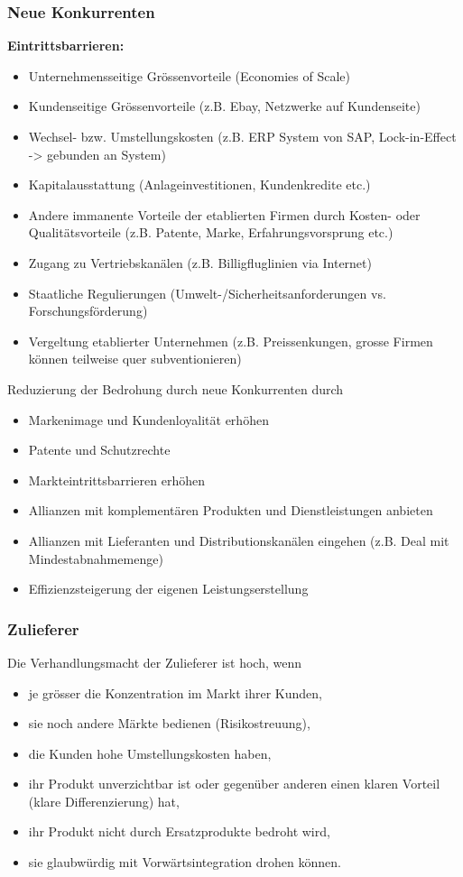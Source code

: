 \subsubsection{Neue Konkurrenten}
\textbf{Eintrittsbarrieren:}
\begin{itemize}
	\item Unternehmensseitige Grössenvorteile (Economies of Scale)
	\item Kundenseitige Grössenvorteile (z.B. Ebay, Netzwerke auf Kundenseite)
	\item Wechsel- bzw. Umstellungskosten (z.B. ERP System von SAP, Lock-in-Effect -> gebunden an System)
	\item Kapitalausstattung (Anlageinvestitionen, Kundenkredite etc.)
	\item Andere immanente Vorteile der etablierten Firmen durch Kosten- oder Qualitätsvorteile (z.B. Patente, Marke, Erfahrungsvorsprung etc.)
	\item Zugang zu Vertriebskanälen (z.B. Billigfluglinien via Internet)
	\item Staatliche Regulierungen (Umwelt-/Sicherheitsanforderungen vs. Forschungsförderung)
	\item Vergeltung etablierter Unternehmen (z.B. Preissenkungen, grosse Firmen können teilweise quer subventionieren)
\end{itemize}
Reduzierung der Bedrohung durch neue Konkurrenten durch
\begin{itemize}
	\item Markenimage und Kundenloyalität erhöhen
	\item Patente und Schutzrechte
	\item Markteintrittsbarrieren erhöhen
	\item Allianzen mit komplementären Produkten und Dienstleistungen anbieten
	\item Allianzen mit Lieferanten und Distributionskanälen eingehen (z.B. Deal mit Mindestabnahmemenge)
	\item Effizienzsteigerung der eigenen Leistungserstellung
\end{itemize}

\subsubsection{Zulieferer}
Die Verhandlungsmacht der Zulieferer ist hoch, wenn
\begin{itemize}
	\item je grösser die Konzentration im Markt ihrer Kunden,
	\item sie noch andere Märkte bedienen (Risikostreuung), 
	\item die Kunden hohe Umstellungskosten haben,
	\item ihr Produkt unverzichtbar ist oder gegenüber anderen einen klaren	Vorteil (klare Differenzierung) hat,
	\item ihr Produkt nicht durch Ersatzprodukte bedroht wird,
	\item sie glaubwürdig mit Vorwärtsintegration drohen können.
\end{itemize}

